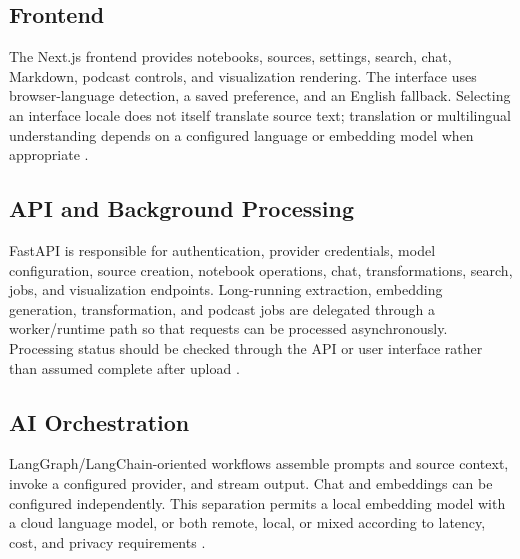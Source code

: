 \documentclass[conference]{IEEEtran}
\begin{document}
\subsection{Frontend}
The Next.js frontend provides notebooks, sources, settings, search, chat, Markdown, podcast controls, and visualization rendering. The interface uses browser-language detection, a saved preference, and an English fallback. Selecting an interface locale does not itself translate source text; translation or multilingual understanding depends on a configured language or embedding model when appropriate \cite{docintel}.

\subsection{API and Background Processing}
FastAPI is responsible for authentication, provider credentials, model configuration, source creation, notebook operations, chat, transformations, search, jobs, and visualization endpoints. Long-running extraction, embedding generation, transformation, and podcast jobs are delegated through a worker/runtime path so that requests can be processed asynchronously. Processing status should be checked through the API or user interface rather than assumed complete after upload \cite{docintel}.

\subsection{AI Orchestration}
LangGraph/LangChain-oriented workflows assemble prompts and source context, invoke a configured provider, and stream output. Chat and embeddings can be configured independently. This separation permits a local embedding model with a cloud language model, or both remote, local, or mixed according to latency, cost, and privacy requirements \cite{langgraph,docintel}.
\end{document}
